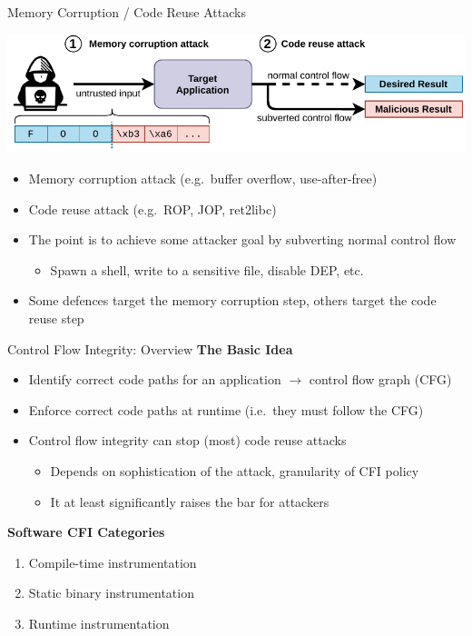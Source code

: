 \documentclass[12pt, dvipsnames, aspectratio=169]{beamer}
\begin{document}
\begin{frame}[c]{Memory Corruption / Code Reuse Attacks}{}
\begin{center}
  \color{black}%
  \includegraphics[width=0.8\columnwidth]{figs/memory_corruption.pdf}
\end{center}

\vfill
\begin{itemize}
  \item Memory corruption attack (e.g.~buffer overflow, use-after-free)
  \item Code reuse attack (e.g.~ROP, JOP, ret2libc)
  \item The point is to achieve some attacker goal by subverting normal control flow
  \begin{itemize}
    \item Spawn a shell, write to a sensitive file, disable DEP, etc.
  \end{itemize}
  \item Some defences target the memory corruption step, others target the code reuse step
\end{itemize}
\end{frame}

\begin{frame}[c]{Control Flow Integrity: Overview}{}
{\bf The Basic Idea}
\begin{itemize}
  \item Identify correct code paths for an application $\rightarrow$ control flow graph (CFG)
  \item Enforce correct code paths at runtime (i.e.~they must follow the CFG)
  \item Control flow integrity can stop (most) code reuse attacks
  \begin{itemize}
    \item Depends on sophistication of the attack, granularity of CFI policy
    \item It at least significantly raises the bar for attackers
  \end{itemize}
\end{itemize}

\vfill
{\bf Software CFI Categories}
\begin{enumerate}
  \item Compile-time instrumentation
  \item Static binary instrumentation
  \item Runtime instrumentation
\end{enumerate}
\end{frame}
\end{document}
